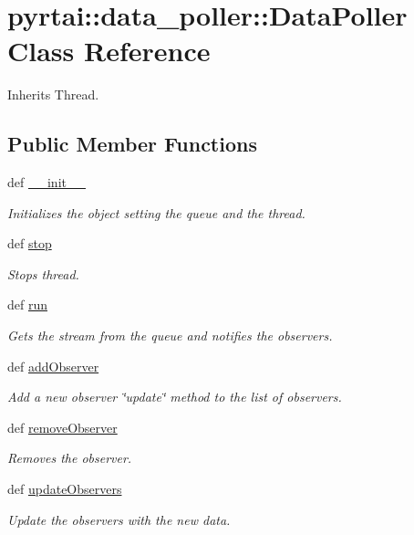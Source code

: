 \hypertarget{classpyrtai_1_1data__poller_1_1_data_poller}{
\section{pyrtai\-:\-:data\-\_\-poller\-:\-:\-Data\-Poller \-Class \-Reference}
\label{classpyrtai_1_1data__poller_1_1_data_poller}
}


\-Inherits \-Thread.

\subsection*{\-Public \-Member \-Functions}
\begin{DoxyCompactItemize}
\item 
def \hyperlink{classpyrtai_1_1data__poller_1_1_data_poller_a6a86bcdd7c32d048907cedced481829f}{\-\_\-\-\_\-init\-\_\-\-\_\-}
\begin{DoxyCompactList}\small\item\em \-Initializes the object setting the queue and the thread. \end{DoxyCompactList}\item 
def \hyperlink{classpyrtai_1_1data__poller_1_1_data_poller_a0df0f53416d7811dfff8e159158bb0e3}{stop}
\begin{DoxyCompactList}\small\item\em \-Stops thread. \end{DoxyCompactList}\item 
def \hyperlink{classpyrtai_1_1data__poller_1_1_data_poller_aa8a8ecba7c5ac97fd875c1e1dd4e7447}{run}
\begin{DoxyCompactList}\small\item\em \-Gets the stream from the queue and notifies the observers. \end{DoxyCompactList}\item 
def \hyperlink{classpyrtai_1_1data__poller_1_1_data_poller_aa7618c1bb30344cc8d950a0e63ec9782}{add\-Observer}
\begin{DoxyCompactList}\small\item\em \-Add a new observer \char`\"{}update\char`\"{} method to the list of observers. \end{DoxyCompactList}\item 
def \hyperlink{classpyrtai_1_1data__poller_1_1_data_poller_ada217b7215596d9ef3c8824c132e6e10}{remove\-Observer}
\begin{DoxyCompactList}\small\item\em \-Removes the observer. \end{DoxyCompactList}\item 
def \hyperlink{classpyrtai_1_1data__poller_1_1_data_poller_a20413727d34a7c1d9ae783c224bd9060}{update\-Observers}
\begin{DoxyCompactList}\small\item\em \-Update the observers with the new data. \end{DoxyCompactList}\end{DoxyCompactItemize}
